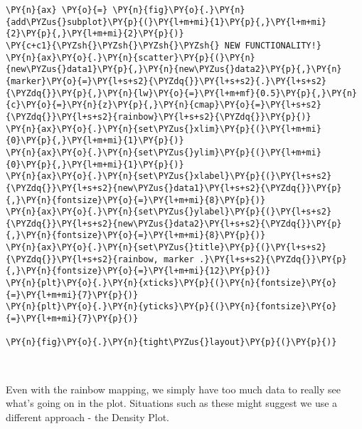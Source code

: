 \begin{tcolorbox}[breakable, size=fbox, boxrule=1pt, pad at break*=1mm,colback=cellbackground, colframe=cellborder]
\begin{Verbatim}[commandchars=\\\{\}]
\PY{n}{ax} \PY{o}{=} \PY{n}{fig}\PY{o}{.}\PY{n}{add\PYZus{}subplot}\PY{p}{(}\PY{l+m+mi}{1}\PY{p}{,}\PY{l+m+mi}{2}\PY{p}{,}\PY{l+m+mi}{2}\PY{p}{)}
\PY{c+c1}{\PYZsh{}\PYZsh{}\PYZsh{}\PYZsh{} NEW FUNCTIONALITY!}
\PY{n}{ax}\PY{o}{.}\PY{n}{scatter}\PY{p}{(}\PY{n}{new\PYZus{}data1}\PY{p}{,}\PY{n}{new\PYZus{}data2}\PY{p}{,}\PY{n}{marker}\PY{o}{=}\PY{l+s+s2}{\PYZdq{}}\PY{l+s+s2}{.}\PY{l+s+s2}{\PYZdq{}}\PY{p}{,}\PY{n}{lw}\PY{o}{=}\PY{l+m+mf}{0.5}\PY{p}{,}\PY{n}{c}\PY{o}{=}\PY{n}{z}\PY{p}{,}\PY{n}{cmap}\PY{o}{=}\PY{l+s+s2}{\PYZdq{}}\PY{l+s+s2}{rainbow}\PY{l+s+s2}{\PYZdq{}}\PY{p}{)}
\PY{n}{ax}\PY{o}{.}\PY{n}{set\PYZus{}xlim}\PY{p}{(}\PY{l+m+mi}{0}\PY{p}{,}\PY{l+m+mi}{1}\PY{p}{)}
\PY{n}{ax}\PY{o}{.}\PY{n}{set\PYZus{}ylim}\PY{p}{(}\PY{l+m+mi}{0}\PY{p}{,}\PY{l+m+mi}{1}\PY{p}{)}
\PY{n}{ax}\PY{o}{.}\PY{n}{set\PYZus{}xlabel}\PY{p}{(}\PY{l+s+s2}{\PYZdq{}}\PY{l+s+s2}{new\PYZus{}data1}\PY{l+s+s2}{\PYZdq{}}\PY{p}{,}\PY{n}{fontsize}\PY{o}{=}\PY{l+m+mi}{8}\PY{p}{)}
\PY{n}{ax}\PY{o}{.}\PY{n}{set\PYZus{}ylabel}\PY{p}{(}\PY{l+s+s2}{\PYZdq{}}\PY{l+s+s2}{new\PYZus{}data2}\PY{l+s+s2}{\PYZdq{}}\PY{p}{,}\PY{n}{fontsize}\PY{o}{=}\PY{l+m+mi}{8}\PY{p}{)}
\PY{n}{ax}\PY{o}{.}\PY{n}{set\PYZus{}title}\PY{p}{(}\PY{l+s+s2}{\PYZdq{}}\PY{l+s+s2}{rainbow, marker .}\PY{l+s+s2}{\PYZdq{}}\PY{p}{,}\PY{n}{fontsize}\PY{o}{=}\PY{l+m+mi}{12}\PY{p}{)}
\PY{n}{plt}\PY{o}{.}\PY{n}{xticks}\PY{p}{(}\PY{n}{fontsize}\PY{o}{=}\PY{l+m+mi}{7}\PY{p}{)}
\PY{n}{plt}\PY{o}{.}\PY{n}{yticks}\PY{p}{(}\PY{n}{fontsize}\PY{o}{=}\PY{l+m+mi}{7}\PY{p}{)}

\PY{n}{fig}\PY{o}{.}\PY{n}{tight\PYZus{}layout}\PY{p}{(}\PY{p}{)}
\end{Verbatim}
\end{tcolorbox}

    \begin{center}
    \end{center}
    { \hspace*{\fill} \\}
    
    Even with the rainbow mapping, we simply have too much data to really
see what's going on in the plot. Situations such as these might suggest
we use a different approach - the Density Plot.

